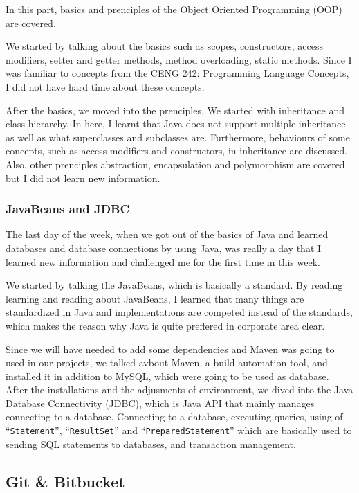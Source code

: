In this part, basics and prenciples of the Object Oriented Programming (OOP) are covered.

We started by talking about the basics such as scopes, constructors, access modifiers, setter and getter methods, method overloading, static methods. Since I was familiar to concepts from the CENG 242: Programming Language Concepts, I did not have hard time about these concepts.

After the basics, we moved into the prenciples. We started with inheritance and class hierarchy. In here, I learnt that Java does not support multiple inheritance as well as what superclasses and subclasses are. Furthermore, behaviours of some concepts, such as access modifiers and constructors, in inheritance are discussed. Also, other prenciples abstraction, encapsulation and polymorphism are covered but I did not learn new information.

\subsubsection{JavaBeans and JDBC}

The last day of the week, when we got out of the basics of Java and learned databases and database connections by using Java, was really a day that I learned new information and challenged me for the first time in this week.

We started by talking the JavaBeans, which is basically a standard. By reading learning and reading about JavaBeans, I learned that many things are standardized in Java and implementations are competed instead of the standards, which makes the reason why Java is quite preffered in corporate area clear.

Since we will have needed to add some dependencies and Maven was going to used in our projects, we talked avbout Maven, a build automation tool, and installed it in addition to MySQL, which were going to be used as database. After the installations and the adjusments of environment, we dived into the Java Database Connectivity (JDBC), which is Java API that mainly manages connecting to a database. Connecting to a database, executing queries, using of ``\texttt{Statement}'', ``\texttt{ResultSet}'' and ``\texttt{PreparedStatement}'' which are basically used to sending SQL statements to databases, and transaction management.


\subsection{Git \& Bitbucket}


